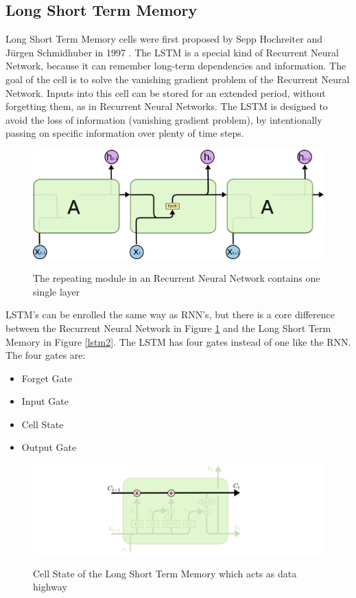 \subsection{Long Short Term Memory}\label{ss:lstm}
Long Short Term Memory cells were first proposed by Sepp Hochreiter and Jürgen Schmidhuber in 1997 \cite{hochreiter1997long}. The LSTM is a special kind of Recurrent Neural Network, because it can remember long-term dependencies and information. The goal of the cell is to solve the vanishing gradient problem of the Recurrent Neural Network. Inputs into this cell can be stored for an extended period, without forgetting them, as in Recurrent Neural Networks. The LSTM is designed to avoid the loss of information (vanishing gradient problem), by intentionally passing on specific information over plenty of time steps. 

\begin{figure}
	\begin{center}
		\includegraphics[width=4.5in]{photos/LSTM3-SimpleRNN}\\
		\caption{The repeating module in an Recurrent Neural Network contains one single layer \cite{olah}}\label{lstm}
	\end{center}
\end{figure}

LSTM's can be enrolled the same way as RNN's, but there is a core difference between the Recurrent Neural Network in Figure \ref{lstm} and the Long Short Term Memory in Figure \ref{lstm2}. The LSTM has four gates instead of one like the RNN. The four gates are:

\begin{itemize}        
	\item Forget Gate
	\item Input Gate
	\item Cell State
	\item Output Gate
\end{itemize}

\begin{figure}
	\begin{center}
		\includegraphics[width=4.5in]{photos/LSTM3-C-line}\\
		\caption{Cell State of the Long Short Term Memory which acts as data highway \cite{olah}}\label{lstm3}
	\end{center}
\end{figure}

